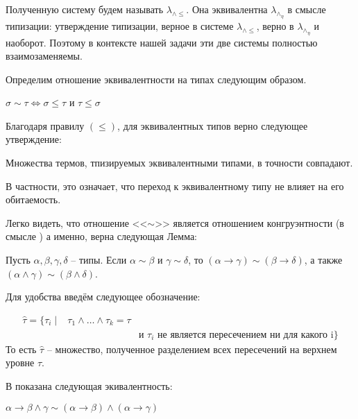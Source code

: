 \documentclass[../main.tex]{subfiles}
\begin{document}
Полученную систему будем называть $\lambda_{\wedge \leqslant}$. Она эквивалентна $\lambda_\wedge_\eta$ в смысле типизации: утверждение типизации, верное в системе  $\lambda_{\wedge \leqslant}$, верно в $\lambda_\wedge_\eta$ и наоборот. Поэтому в контексте нашей задачи эти две системы полностью взаимозаменяемы.

Определим отношение эквивалентности на типах следующим образом. 

\begin{definition}
$\sigma \sim \tau \iff \sigma \leqslant \tau$ и $\tau \leqslant \sigma$
\end{definition}

Благодаря правилу $(\leqslant)$, для эквивалентных типов верно следующее утверждение:

\begin{lemma}
Множества термов, тпизируемых эквивалентными типами, в точности совпадают.
\end{lemma}

В частности, это означает, что переход к эквивалентному типу не влияет на его обитаемость.

Легко видеть, что отношение <<$\sim$>> является отношением конгруэнтности (в смысле \cite{barendregt_2013}) а именно, верна следующая Лемма:
\begin{lemma}
Пусть $\alpha, \beta, \gamma, \delta$ -- типы. 
Если $\alpha \sim \beta$ и $\gamma \sim \delta$, то $(\alpha \to \gamma) \sim (\beta \to \delta)$, а также $(\alpha \wedge \gamma) \sim (\beta \wedge \delta)$.
\end{lemma}



Для удобства введём следующее обозначение: 
\begin{definition}
\begin{align*}
\hat{\tau} = \{\tau_i \mid & \tau_1 \wedge \dots \wedge \tau_k = \tau \\
                               && \text{и $\tau_i$ не является пересечением ни для какого i} \}
\end{align*}
То есть $\hat{\tau}$ -- множество, полученное разделением всех пересечений на верхнем уровне $\tau$.
\end{definition}


В \cite{hindley_1982} показана следующая экивалентность: 
\begin{lemma}
$\alpha \to \beta \wedge \gamma \sim (\alpha \to \beta) \wedge (\alpha \to \gamma)$
\end{lemma}
\end{document}
